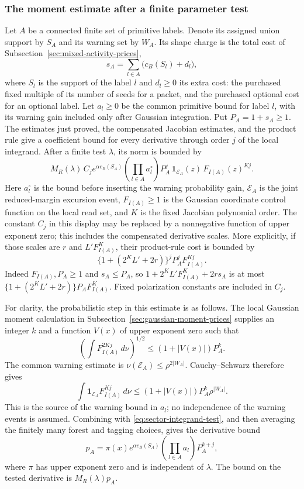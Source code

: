 \subsubsection{The moment estimate after a finite parameter test}
Let $A$ be a connected finite set of primitive labels. Denote its
assigned union support by $S_A$ and its warning set by $W_A$. Its
shape charge is the total cost of
Subsection~\ref{sec:mixed-activity-prices},
\[
             s_A=\sum_{l\in A}\bigl(c_B(S_l)+d_l\bigr),
\]
where $S_l$ is the support of the label $l$ and $d_l\ge0$ its extra
cost: the purchased fixed multiple of its number of seeds for a
packet, and the purchased optional cost for an optional label. Let
$a_l\ge0$ be the common
primitive bound for label $l$, with its warning gain included only
after Gaussian integration. Put $P_A=1+s_A\ge1$. The estimates
just proved, the compensated Jacobian estimates, and the product
rule give a coefficient bound for every derivative through order
$j$ of the local integrand. After a finite test $\lambda$, its
norm is bounded by
\begin{equation}\label{eq:sector-integrand-test}
 M_R(\lambda)\,C_j e^{\alpha c_B(S_A)}
       \left(\prod_{l\in A}a_l^{\circ}\right)
       P_A^j\,\mathbf1_{\mathcal E_A}(z)\,F_{I(A)}(z)^{Kj}.
\end{equation}
Here $a_l^{\circ}$ is the bound before inserting the warning
probability gain, $\mathcal E_A$ is the joint reduced-margin
excursion event, $F_{I(A)}\ge1$ is the Gaussian coordinate
control function on the local read set, and $K$ is the fixed
Jacobian polynomial order. The constant $C_j$ in this display
may be replaced by a nonnegative function of upper exponent zero;
this includes the compensated derivative scales. More explicitly,
if those scales are $r$ and $L'F_{I(A)}^K$, their product-rule
cost is bounded by
\[
 \{1+(2^KL'+2r)\}^{j}P_A^jF_{I(A)}^{Kj}.
\]
Indeed $F_{I(A)},P_A\ge1$ and $s_A\le P_A$, so
$1+2^KL'F_{I(A)}^K+2rs_A$ is at most
$\{1+(2^KL'+2r)\}P_AF_{I(A)}^K$. Fixed polarization constants
are included in $C_j$.

For clarity, the probabilistic step in this estimate is as follows.
The local Gaussian moment calculation in
Subsection~\ref{sec:gaussian-moment-prices} supplies an integer $k$
and a function $V(x)$ of upper exponent zero such that
\[
 \left(\int F_{I(A)}^{2Kj}\,d\nu\right)^{1/2}
                                  \le(1+|V(x)|)P_A^k.
\]
The common warning estimate is
$\nu(\mathcal E_A)\le\rho^{2|W_A|}$.
Cauchy--Schwarz therefore gives
\[
 \int\mathbf1_{\mathcal E_A}F_{I(A)}^{Kj}\,d\nu
                  \le(1+|V(x)|)P_A^k\rho^{|W_A|}.
\]
This is the source of the warning bound in $a_l$; no independence
of the warning events is assumed. Combining with
\eqref{eq:sector-integrand-test}, and then averaging the finitely
many forest and tagging choices, gives the derivative bound
\begin{equation}\label{eq:sector-polymer-price}
 p_A=\pi(x)e^{\alpha c_B(S_A)}
                   \left(\prod_{l\in A}a_l\right)P_A^{k+j},
\end{equation}
where $\pi$ has upper exponent zero and is independent of
$\lambda$. The bound on the tested derivative is
$M_R(\lambda)p_A$.


